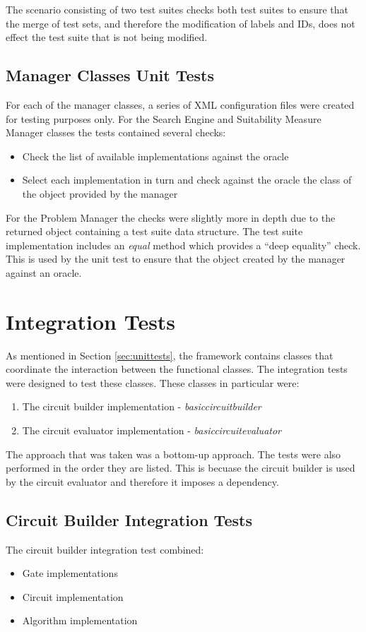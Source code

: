 The scenario consisting of two test suites checks both test suites to ensure that the merge of test sets, and therefore the modification of labels and IDs, does not effect the test suite that is not being modified.

\subsection{Manager Classes Unit Tests}
\label{sec:manclasstests}
For each of the manager classes, a series of XML configuration files were created for testing purposes only.
For the Search Engine and Suitability Measure Manager classes the tests contained several checks:
\begin{itemize}
 \item Check the list of available implementations against the oracle
 \item Select each implementation in turn and check against the oracle the class of the object provided by the manager
\end{itemize}

For the Problem Manager the checks were slightly more in depth due to the returned object containing a test suite data structure.
The test suite implementation includes an \emph{equal} method which provides a ``deep equality'' check.
This is used by the unit test to ensure that the object created by the manager against an oracle.

\section{Integration Tests}
As mentioned in Section \ref{sec:unittests}, the framework contains classes that coordinate the interaction between the functional classes.
The integration tests were designed to test these classes.
These classes in particular were:
\begin{enumerate}
 \item The circuit builder implementation - \emph{basiccircuitbuilder}
 \item The circuit evaluator implementation - \emph{basiccircuitevaluator}
\end{enumerate}

The approach that was taken was a bottom-up approach.
The tests were also performed in the order they are listed.
This is becuase the circuit builder is used by the circuit evaluator and therefore it imposes a dependency.

\subsection{Circuit Builder Integration Tests}
The circuit builder integration test combined:
\begin{itemize}
 \item Gate implementations
 \item Circuit implementation
 \item Algorithm implementation
\end{itemize}

